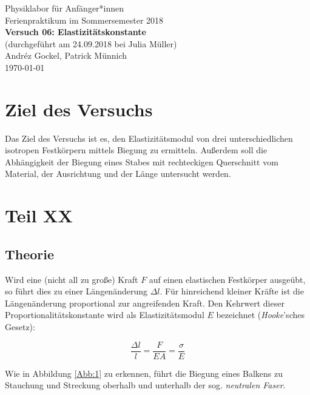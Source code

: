 \documentclass[11pt,a4paper]{article}
\begin{document}
{
\centering 
\large 
Physiklabor für Anf\"anger*innen \\
Ferienpraktikum im Sommersemester 2018 \\[4mm]
\textbf{\LARGE 
Versuch 06: Elastizitätskonstante
} \\[3mm]
(durchgef\"uhrt am 24.09.2018 bei Julia Müller) \\
Andréz Gockel, Patrick M\"unnich\\
\today \\[10mm]
}

\vspace{50pt}
\tableofcontents
\vspace{22pt}
\listoftables
\vspace{22pt}
\listoffigures
\pagebreak
\phantom{lol}
\pagebreak

\section{Ziel des Versuchs}

Das Ziel des Versuchs ist es, den Elastizit\"atsmodul von drei unterschiedlichen isotropen Festk\"orpern mittels Biegung zu ermitteln. Au\ss erdem soll die Abh\"angigkeit der Biegung eines Stabes mit rechteckigen Querschnitt vom Material, der Ausrichtung und der L\"ange untersucht werden.

\section{Teil XX}

\subsection{Theorie}

Wird eine (nicht all zu gro\ss e) Kraft $F$ auf einen elastischen Festk\"orper ausge\"ubt, so f\"uhrt dies zu einer L\"angen\"anderung $\Delta l$. F\"ur hinreichend kleiner Kr\"afte ist die L\"angen\"anderung proportional zur angreifenden Kraft. Den Kehrwert dieser Proportionalit\"atskonstante wird als Elastizit\"atsmodul $E$ bezeichnet (\textit{Hooke}'sches Gesetz):

\begin{equation}
\frac{\Delta l}{l}=\frac{F}{EA}=\frac{\sigma}{E}\label{eq:elast}
\end{equation}

Wie in Abbildung \ref{Abb:1} zu erkennen, f\"uhrt die Biegung eines Balkens zu Stauchung und Streckung oberhalb und unterhalb der sog. \textit{neutralen Faser}.
\end{document}
